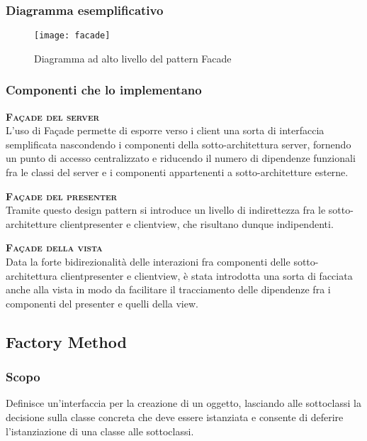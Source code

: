 \subsubsection{Diagramma esemplificativo}
\begin{figure}[H]
\centering
\texttt{[image: facade]}
\caption{Diagramma ad alto livello del pattern Facade}\label{fig:façade}
\end{figure}

\subsubsection{Componenti che lo implementano}
\begin{description}
  \item{\scshape\bfseries Façade del server}\\
L'uso di Façade permette di esporre verso i client una sorta di interfaccia semplificata nascondendo i componenti della sotto-architettura server, fornendo un punto di accesso centralizzato e riducendo il numero di dipendenze funzionali fra le classi del server e i componenti appartenenti a sotto-architetture esterne.
  \item{\scshape\bfseries Façade del presenter}\\
Tramite questo design pattern si introduce un livello di indirettezza fra le sotto-architetture clientpresenter e clientview, che risultano dunque indipendenti.
  \item{\scshape\bfseries Façade della vista}\\
Data la forte bidirezionalità delle interazioni fra componenti delle sotto-architettura clientpresenter e clientview, è stata introdotta una sorta di facciata anche alla vista in modo da facilitare il tracciamento delle dipendenze fra i componenti del presenter e quelli della view.
\end{description}

\subsection{Factory Method}

\subsubsection{Scopo}
Definisce un'interfaccia per la creazione di un oggetto, lasciando alle sottoclassi la decisione sulla classe concreta che deve essere istanziata e consente di deferire l'istanziazione di una classe alle sottoclassi.

